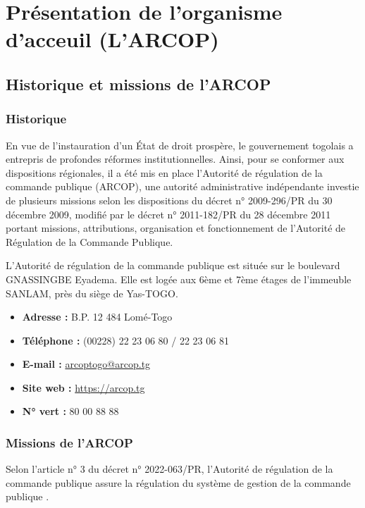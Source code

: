 \chapter{Présentation de l'organisme d'acceuil (L'\acs{ARCOP})}
\clearpage
\section{Historique et missions de l’\acs{ARCOP}}

\subsection{Historique}
En vue de l’instauration d’un État de droit prospère, le gouvernement togolais a entrepris de profondes réformes institutionnelles. Ainsi, pour se conformer aux dispositions régionales, il a été mis en place l’Autorité de régulation de la commande publique (\ac{ARCOP}), une autorité administrative indépendante investie de plusieurs missions selon les dispositions du décret n° 2009-296/PR du 30 décembre 2009, modifié par le décret n° 2011-182/PR du 28 décembre 2011 portant missions, attributions, organisation et fonctionnement de l’Autorité de Régulation de la Commande Publique.

L’Autorité de régulation de la commande publique est située sur le boulevard GNASSINGBE Eyadema. Elle est logée aux 6ème et 7ème étages de l’immeuble SANLAM, près du siège de Yas-TOGO.

\begin{itemize}
    \item \textbf{Adresse :} B.P. 12 484 Lomé-Togo
    \item \textbf{Téléphone :} (00228) 22 23 06 80 / 22 23 06 81
    \item \textbf{E-mail :} \href{arcoptogo@arcop.tg}{arcoptogo@arcop.tg}
    \item \textbf{Site web :} \href{https://arcop.tg}{https://arcop.tg}
    \item \textbf{N° vert :} 80 00 88 88
\end{itemize}

\subsection{Missions de l’\acs{ARCOP}}
Selon l’article n° 3 du décret n° 2022-063/PR, \og l’Autorité de régulation de la commande publique assure la régulation du système de gestion de la commande publique \fg.

